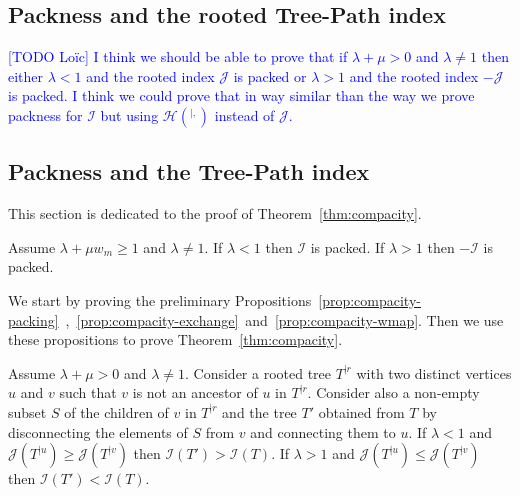 \documentclass[11 pt]{modarticle}
\newcommand{\wmin}{w_m}
\newcommand{\rtree}[2]{{#1}^{\lvert #2}}
\newcommand{\indexsymbol}{\mathcal{I}}
\newcommand{\tindex}[1]{\indexsymbol(#1)}
\newcommand{\rindexsymbol}{\mathcal{J}}
\newcommand{\rindex}[2]{\rindexsymbol(\rtree{#2}{#1})}
\newcommand{\aindexsymbol}{\mathcal{H}}
\newcommand{\aindex}[3]{\aindexsymbol(\rtree{#3}{#1, #2})}
\newcommand{\ldtodo}[1]{\textcolor{blue}{{\footnotesize [TODO Loïc]} #1}}
\begin{document}
\subsection{Packness and the rooted Tree-Path index}

\ldtodo{I think we should be able to prove that if $\lambda + \mu > 0$ and $\lambda \neq 1$ then either $\lambda < 1$ and the rooted index $\rindexsymbol$ is packed or $\lambda > 1$ and the rooted index $-\rindexsymbol$ is packed. I think we could prove that in way similar than the way we prove packness for $\indexsymbol$ but using $\aindex{}{}{}$ instead of $\rindexsymbol$.}












\subsection{Packness and the Tree-Path index}

This section is dedicated to the proof of Theorem~\ref{thm:compacity}.

\begin{thm}\label{thm:compacity}
 Assume $\lambda + \mu \wmin \geq 1$ and $\lambda \neq 1$. If $\lambda < 1$ then $\indexsymbol$ is packed. If $\lambda > 1$ then ${-\indexsymbol}$ is packed.
\end{thm}


We start by proving the preliminary Propositions~\ref{prop:compacity-packing}~,~\ref{prop:compacity-exchange}~and~\ref{prop:compacity-wmap}. Then we use these propositions to prove Theorem~\ref{thm:compacity}.


\begin{prop}\label{prop:compacity-packing}
Assume $\lambda + \mu > 0$ and $\lambda \neq 1$. Consider a rooted tree $\rtree{T}{r}$ with two distinct vertices $u$ and $v$ such that $v$ is not an ancestor of $u$ in $\rtree{T}{r}$. Consider also a non-empty subset $S$ of the children of $v$ in $\rtree{T}{r}$ and the tree $T'$ obtained from $T$ by disconnecting the elements of $S$ from $v$ and connecting them to $u$. If $\lambda < 1$ and $\rindex{u}{T} \geq \rindex{v}{T}$ then $\tindex{T'} > \tindex{T}$. If $\lambda > 1$ and $\rindex{u}{T} \leq \rindex{v}{T}$ then $\tindex{T'} < \tindex{T}$.
\end{prop}
\end{document}
